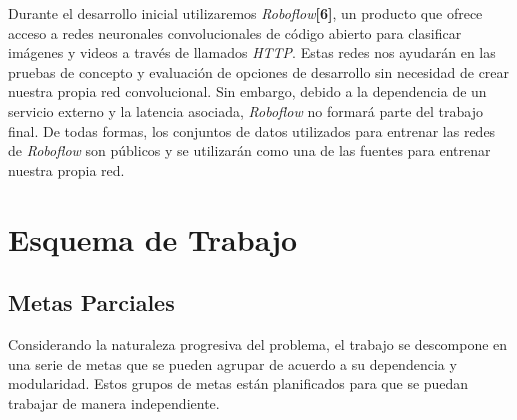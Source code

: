 \documentclass[a4paper]{article}
\begin{document}
Durante el desarrollo inicial utilizaremos \emph{Roboflow}\textbf{[6]}, un producto que ofrece acceso a redes neuronales convolucionales de código abierto para clasificar imágenes y videos a través de llamados \emph{HTTP}. Estas redes nos ayudarán en las pruebas de concepto y evaluación de opciones de desarrollo sin necesidad de crear nuestra propia red convolucional.
Sin embargo, debido a la dependencia de un servicio externo y la latencia asociada, \emph{Roboflow} no formará parte del trabajo final. De todas formas, los conjuntos de datos utilizados para entrenar las redes de \emph{Roboflow} son públicos y se utilizarán como una de las fuentes para entrenar nuestra propia red.

\section{Esquema de Trabajo}
\subsection{Metas Parciales}

Considerando la naturaleza progresiva del problema, el trabajo se descompone en una serie de metas que se pueden agrupar de acuerdo a su dependencia y modularidad. Estos grupos de metas están planificados para que se puedan trabajar de manera independiente.
\end{document}
